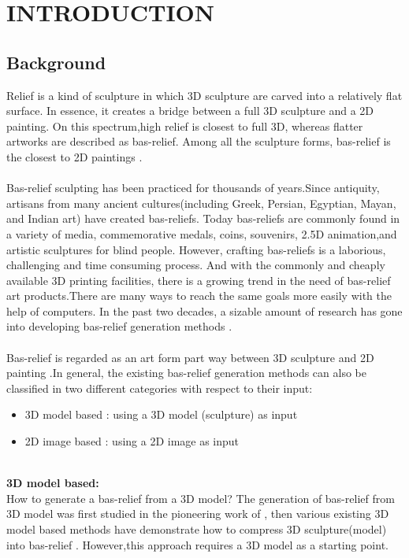\chapter{INTRODUCTION}

\section{Background}

Relief is a kind of sculpture in which 3D sculpture are carved into a relatively flat surface. In essence, it creates a bridge between a full 3D sculpture and a 2D painting. On this spectrum,high relief is closest to full 3D, whereas flatter artworks are described as bas-relief. Among all the sculpture forms, bas-relief is the closest to 2D paintings\cite{kerber2009feature} \cite{barron2012color}.\\ \\
Bas-relief sculpting has been practiced for thousands of years.Since antiquity, artisans from many ancient cultures(including Greek, Persian, Egyptian, Mayan, and Indian art) have created bas-reliefs.
Today bas-reliefs are commonly found in a variety of media, commemorative medals, coins, souvenirs, 2.5D animation,and artistic sculptures for blind people. However, crafting bas-reliefs is a laborious, challenging and time consuming process. And with the commonly and cheaply available 3D printing facilities, there is a growing trend in the need of bas-relief art products.There are many ways to reach the same goals more easily with the help of computers. In the past two decades, a sizable amount of research has gone into developing bas-relief generation methods \cite{benzaid2017analysis}.\\ \\ 
Bas-relief is regarded as an art form part way between 3D sculpture and 2D painting \cite{benzaid2017analysis}\cite{barron2012color}\cite{weyrich2007digital}\cite{kerber2009feature}\cite{kerber2012computer}.In general, the existing bas-relief generation methods can also be classified in two different categories with respect to their input\cite{benzaid2017analysis}:
\begin{itemize}
 \item 3D model based : using a 3D model (sculpture) as input 
 \item 2D image based : using a 2D image as input \\ \\
\end{itemize} 
\textbf{3D model based:}\\ How to generate a bas-relief from a 3D model? The generation of bas-relief from 3D model was first studied in the pioneering work of \cite{cignoni1997computer}, then various existing 3D model based methods have demonstrate how to compress 3D sculpture(model) into bas-relief \cite{weyrich2007digital}\cite{kerber2009feature}\cite{song2007automatic}\cite{sun2009bas} . However,this approach requires a 3D model as a starting point. \\ \\
